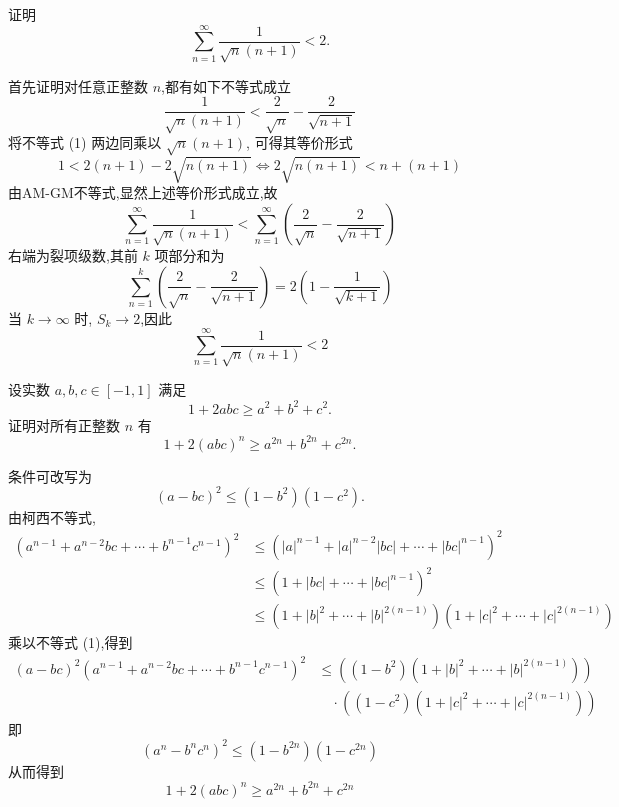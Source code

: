 \begin{questions}
    \question 证明
    \[
    \sum_{n=1}^\infty \frac{1}{\sqrt{n}(n+1)} < 2.
    \]
    \begin{solution}
        首先证明对任意正整数 $n$,都有如下不等式成立
        \[
        \frac{1}{\sqrt{n}(n+1)} < \frac{2}{\sqrt{n}} - \frac{2}{\sqrt{n+1}} \tag{1}
        \]
        将不等式 (1) 两边同乘以 $\sqrt{n}(n+1)$, 可得其等价形式
        \[
        1 < 2(n+1) - 2\sqrt{n(n+1)} \Longleftrightarrow 2\sqrt{n(n+1)} < n + (n+1)
        \]
        由AM-GM不等式,显然上述等价形式成立,故       
        \[
        \sum_{n=1}^\infty \frac{1}{\sqrt{n}(n+1)} < \sum_{n=1}^\infty \left( \frac{2}{\sqrt{n}} - \frac{2}{\sqrt{n+1}} \right)
        \]
        右端为裂项级数,其前 $k$ 项部分和为
        \[
        \sum_{n=1}^k\left( \frac{2}{\sqrt{n}} - \frac{2}{\sqrt{n+1}} \right) = 2 \left( 1 - \frac{1}{\sqrt{k+1}} \right)
        \]
        当 $k \to \infty$ 时, $S_k \to 2$,因此
        \[
        \sum_{n=1}^\infty \frac{1}{\sqrt{n}(n+1)} < 2
        \]
    \end{solution}

    \question 设实数 $a,b,c \in [-1,1]$ 满足
    \[
    1 + 2abc \ge a^2 + b^2 + c^2.
    \]
    证明对所有正整数 $n$ 有
    \[
    1 + 2(abc)^n \ge a^{2n} + b^{2n} + c^{2n}.
    \]
    \begin{solution}
        条件可改写为
        \[
        (a - bc)^2 \le (1-b^2)(1-c^2). \tag{1}
        \]
        由柯西不等式,
        \begin{align*}
        (a^{n-1} + a^{n-2} bc + \cdots + b^{n-1} c^{n-1})^2 
        &\le (|a|^{n-1} + |a|^{n-2}|bc| + \cdots + |bc|^{n-1})^2 \\
        &\le (1 + |bc| + \cdots + |bc|^{n-1})^2 \\
        &\le (1 + |b|^2 + \cdots + |b|^{2(n-1)}) (1 + |c|^2 + \cdots + |c|^{2(n-1)})
        \end{align*}
        乘以不等式 (1),得到
        \begin{align*}
        (a - bc)^2 (a^{n-1} + a^{n-2} bc + \cdots + b^{n-1} c^{n-1})^2 
        &\le ((1-b^2)(1 + |b|^2 + \cdots + |b|^{2(n-1)})) \\
        &\quad \cdot ((1-c^2)(1 + |c|^2 + \cdots + |c|^{2(n-1)})) 
        \end{align*}
        即
        \[
        (a^n - b^n c^n)^2 \le (1 - b^{2n})(1 - c^{2n})
        \]
        从而得到
        \[
        1 + 2(abc)^n \ge a^{2n} + b^{2n} + c^{2n}
        \]
    \end{solution}


\end{questions}
